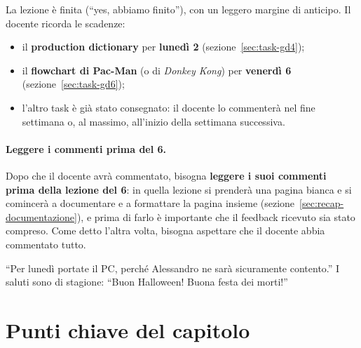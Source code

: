 La lezione è finita (``yes, abbiamo finito''), con un leggero margine di
anticipo. Il docente ricorda le scadenze:
\begin{itemize}
  \item il \textbf{production dictionary} per \textbf{lunedì 2}
        (sezione~\ref{sec:task-gd4});
  \item il \textbf{flowchart di Pac-Man} (o di \emph{Donkey Kong}) per
        \textbf{venerdì 6} (sezione~\ref{sec:task-gd6});
  \item l'altro task è già stato consegnato: il docente lo commenterà nel
        fine settimana o, al massimo, all'inizio della settimana successiva.
\end{itemize}

\paragraph{Leggere i commenti prima del 6.} Dopo che il docente avrà
commentato, bisogna \textbf{leggere i suoi commenti prima della lezione del
6}: in quella lezione si prenderà una pagina bianca e si comincerà a
documentare e a formattare la pagina insieme (sezione~\ref{sec:recap-documentazione}),
e prima di farlo è importante che il feedback ricevuto sia stato compreso.
Come detto l'altra volta, bisogna aspettare che il docente abbia commentato
tutto.

``Per lunedì portate il PC, perché Alessandro ne sarà sicuramente contento.''
I saluti sono di stagione: ``Buon Halloween! Buona festa dei morti!''

\section*{Punti chiave del capitolo}

